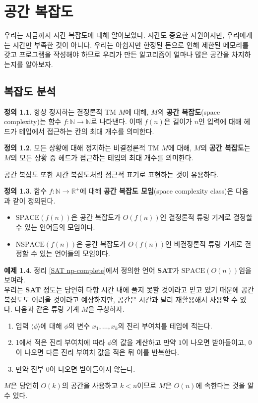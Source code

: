 \documentclass[b5paper, 11pt]{book}
\theoremstyle{definition}
\newtheorem{defn}{정의}[chapter]
\newtheorem{ex}[defn]{예제}
\begin{document}
\chapter{공간 복잡도}
우리는 지금까지 시간 복잡도에 대해 알아보았다. 시간도 중요한 자원이지만, 우리에게는 시간만 부족한 것이 아니다. 우리는 아쉽지만 한정된 돈으로 인해 제한된 메모리를 갖고 프로그램을 작성해야 하므로 우리가 만든 알고리즘이 얼마나 많은 공간을 차지하는지를 알아보자.
\section{복잡도 분석}
\begin{defn}
    항상 정지하는 결정론적 TM $M$에 대해, $M$의 \textbf{공간 복잡도}(space complexity)는 함수 $f: \mathbb{N} \rightarrow \mathbb{N}$로 나타낸다. 이때 $f(n)$은 길이가 $n$인 입력에 대해 헤드가 테입에서 접근하는 칸의 최대 개수를 의미한다. 
\end{defn}
\begin{defn}
    모든 상황에 대해 정지하는 비결정론적 TM $M$에 대해, $M$의 \textbf{공간 복잡도}는 $M$의 모든 상황 중 헤드가 접근하는 테입의 최대 개수를 의미한다.
\end{defn}
공간 복잡도 또한 시간 복잡도처럼 점근적 표기로 표현하는 것이 유용하다.
\begin{defn}
    함수 $f : \mathbb{N} \rightarrow \mathbb{R}^+$에 대해 \textbf{공간 복잡도 모임}(space complexity class)은 다음과 같이 정의된다.
    \begin{itemize}
        \item $\text{SPACE}(f(n))$은 공간 복잡도가 $O(f(n))$인 결정론적 튜링 기계로 결정할 수 있는 언어들의 모임이다.
        \item $\text{NSPACE}(f(n))$은 공간 복잡도가 $O(f(n))$인 비결정론적 튜링 기계로 결정할 수 있는 언어들의 모임이다.
    \end{itemize}
\end{defn} 
\begin{ex}
    정리 \ref{SAT np-complete}에서 정의한 언어 \textbf{SAT}가 $\text{SPACE}(O(n))$임을 보여라. \\ 
    우리는 \textbf{SAT} 정도는 당연히 다항 시간 내에 풀지 못할 것이라고 믿고 있기 때문에 공간 복잡도도 어려울 것이라고 예상하지만, 공간은 시간과 달리 재활용해서 사용할 수 있다. 다음과 같은 튜링 기계 $M$을 구상하자. 
    \begin{enumerate}
        \item 입력 $\langle \phi \rangle$에 대해 $\phi$의 변수 $x_1, \ldots, x_k$의 진리 부여치를 테입에 적는다. 
        \item 1에서 적은 진리 부여치에 따라 $\phi$의 값을 계산하고 만약 $1$이 나오면 받아들이고, 0이 나오면 다른 진리 부여치 값을 적은 뒤 이를 반복한다.
        \item 만약 전부 0이 나오면 받아들이지 않는다.
    \end{enumerate}
    $M$은 당연히 $O(k)$의 공간을 사용하고 $k<n$이므로 $M$은 $O(n)$에 속한다는 것을 알 수 있다.
\end{ex}
\end{document}
